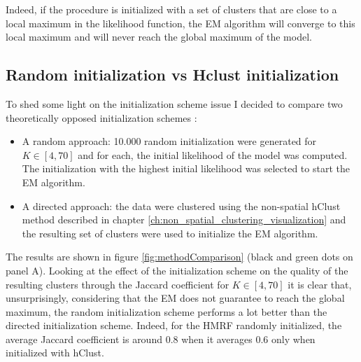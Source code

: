 Indeed, if the procedure is initialized with a set of clusters that are close to a local maximum in the likelihood function, the EM algorithm will converge to this local maximum and will never reach the global maximum of the model.

	\subsection{Random initialization vs Hclust initialization}
	To shed some light on the initialization scheme issue I decided to compare two theoretically opposed initialization schemes :
\begin{itemize}
	\item A random approach: 10.000 random initialization were generated for $K \in [4,70]$ and for each, the initial likelihood of the model was computed. The initialization with the highest initial likelihood was selected to start the EM algorithm.
	\item A directed approach: the data were clustered using the non-spatial hClust method described in chapter \ref{ch:non_spatial_clustering_visualization} and the resulting set of clusters were used to initialize the EM algorithm.
\end{itemize}

The results are shown in figure \ref{fig:methodComparison} (black and green dots on panel A). Looking at the effect of the initialization scheme on the quality of the resulting clusters through the Jaccard coefficient for $K \in [4,70]$ it is clear that, unsurprisingly, considering that the EM does not guarantee to reach the global maximum, the random initialization scheme performs a lot better than the directed initialization scheme. Indeed, for the HMRF randomly initialized, the average Jaccard coefficient is around $0.8$ when it averages $0.6$ only when initialized with hClust.\\

